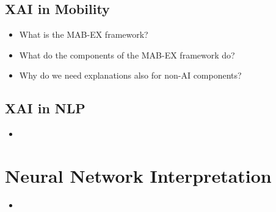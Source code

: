 \documentclass{report}
\begin{document}
		\subsection{XAI in Mobility}
		
		\begin{itemize}
		\item What is the MAB-EX framework?
		\item What do the components of the MAB-EX framework do?
		\item Why do we need explanations also for non-AI components?
		\end{itemize}
	
		\subsection{XAI in NLP}
		
		\begin{itemize}
		\item 
		\end{itemize}
	
	\section{Neural Network Interpretation}
	
	\begin{itemize}
		\item 
	\end{itemize}
	
	
\end{document}
